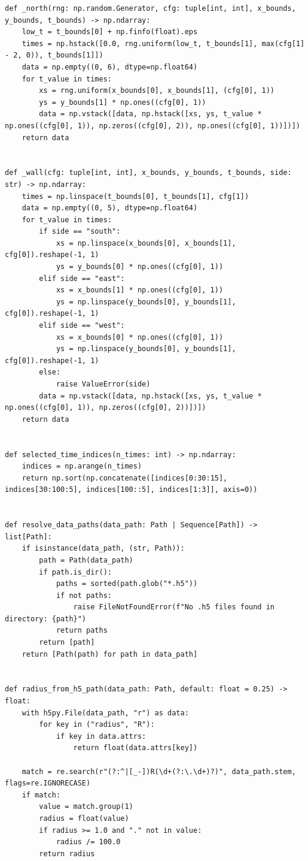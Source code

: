 \begin{lstlisting}
def _north(rng: np.random.Generator, cfg: tuple[int, int], x_bounds, y_bounds, t_bounds) -> np.ndarray:
    low_t = t_bounds[0] + np.finfo(float).eps
    times = np.hstack([0.0, rng.uniform(low_t, t_bounds[1], max(cfg[1] - 2, 0)), t_bounds[1]])
    data = np.empty((0, 6), dtype=np.float64)
    for t_value in times:
        xs = rng.uniform(x_bounds[0], x_bounds[1], (cfg[0], 1))
        ys = y_bounds[1] * np.ones((cfg[0], 1))
        data = np.vstack([data, np.hstack([xs, ys, t_value * np.ones((cfg[0], 1)), np.zeros((cfg[0], 2)), np.ones((cfg[0], 1))])])
    return data


def _wall(cfg: tuple[int, int], x_bounds, y_bounds, t_bounds, side: str) -> np.ndarray:
    times = np.linspace(t_bounds[0], t_bounds[1], cfg[1])
    data = np.empty((0, 5), dtype=np.float64)
    for t_value in times:
        if side == "south":
            xs = np.linspace(x_bounds[0], x_bounds[1], cfg[0]).reshape(-1, 1)
            ys = y_bounds[0] * np.ones((cfg[0], 1))
        elif side == "east":
            xs = x_bounds[1] * np.ones((cfg[0], 1))
            ys = np.linspace(y_bounds[0], y_bounds[1], cfg[0]).reshape(-1, 1)
        elif side == "west":
            xs = x_bounds[0] * np.ones((cfg[0], 1))
            ys = np.linspace(y_bounds[0], y_bounds[1], cfg[0]).reshape(-1, 1)
        else:
            raise ValueError(side)
        data = np.vstack([data, np.hstack([xs, ys, t_value * np.ones((cfg[0], 1)), np.zeros((cfg[0], 2))])])
    return data


def selected_time_indices(n_times: int) -> np.ndarray:
    indices = np.arange(n_times)
    return np.sort(np.concatenate([indices[0:30:15], indices[30:100:5], indices[100::5], indices[1:3]], axis=0))


def resolve_data_paths(data_path: Path | Sequence[Path]) -> list[Path]:
    if isinstance(data_path, (str, Path)):
        path = Path(data_path)
        if path.is_dir():
            paths = sorted(path.glob("*.h5"))
            if not paths:
                raise FileNotFoundError(f"No .h5 files found in directory: {path}")
            return paths
        return [path]
    return [Path(path) for path in data_path]


def radius_from_h5_path(data_path: Path, default: float = 0.25) -> float:
    with h5py.File(data_path, "r") as data:
        for key in ("radius", "R"):
            if key in data.attrs:
                return float(data.attrs[key])

    match = re.search(r"(?:^|[_-])R(\d+(?:\.\d+)?)", data_path.stem, flags=re.IGNORECASE)
    if match:
        value = match.group(1)
        radius = float(value)
        if radius >= 1.0 and "." not in value:
            radius /= 100.0
        return radius


\end{lstlisting}
